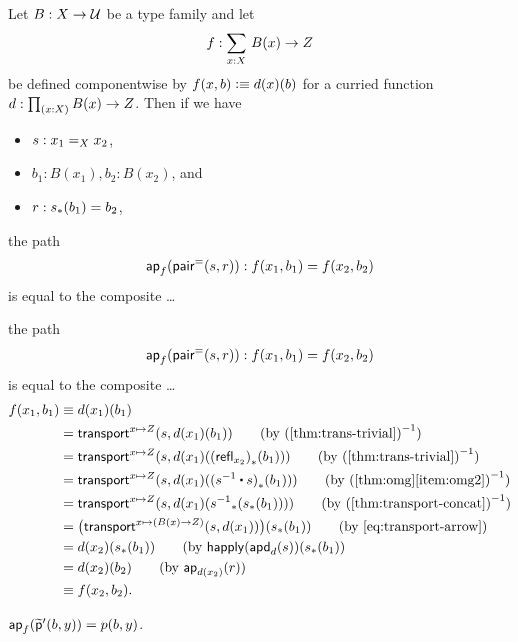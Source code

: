 \documentclass[centering]{report}
\newenvironment{slide}
    {\newpage
    \vspace*{\fill}
    }
    { 
     \vspace*{\fill}
    }
\newcommand{\breakslide}{\vspace*{\fill}\newpage\vspace*{\fill}}
\begin{document}
\begin{slide}
\begin{lem}\label{thm:ap-sigma-rect-path-pair}
  Let $B:X\to\type$ be a type family and let
  \begin{align*}f:\sm{x:X} B(x) \to Z\end{align*}
  be defined componentwise by $f(x,b) \defeq d(x)(b)$ for a curried function $d:\prd{x:X} B(x)\to Z$.
  Then if we have
  \begin{itemize}
  \item $s:\id[X]{x_1}{x_2}$,
  \item $b_1:B(x_1), b_2:B(x_2)$, and
  \item $r:\trans{s}{b_1}=b_2$,
  \end{itemize}

 the path
  \begin{align*}
    \apfunc f (\pairpath(s,r)) :f(x_1,b_1) = f(x_2,b_2)
  \end{align*}
  is equal to the composite \dots

\breakslide

{\color{gray}
\everymath{\color{gray}}
the path
  \begin{align*}
    \apfunc f (\pairpath(s,r)) :f(x_1,b_1) = f(x_2,b_2)
  \end{align*}
  is equal to the composite \dots
}
{\LARGE
  \begin{align}
    f(x_1,b_1)
    &\jdeq d(x_1)(b_1) \notag\\
    &= \transfib{x\mapsto Z}{s}{d(x_1)(b_1)}
    \tag{by $\opp{\text{(\cref{thm:trans-trivial})}}$}\\
    &= \transfib{x\mapsto Z}{s}{d(x_1)(\trans{(\refl{x_2})}{b_1})}
    \tag{by $\opp{\text{(\cref{thm:trans-trivial})}}$}\\
    &= \transfib{x\mapsto Z}{s}{d(x_1)(\trans{(\opp s\ct s)}{b_1})}
    \tag{by $\opp{\text{(\cref{thm:omg}\ref{item:omg2})}}$}\\
    &= \transfib{x\mapsto Z}{s}{d(x_1)(\trans{\opp s}{\trans{s}{b_1}})}
    \tag{by $\opp{\text{(\cref{thm:transport-concat})}}$}\\
    &= \big(\transfib{x\mapsto (B(x)\to Z)}{s}{d(x_1)}\big)(\trans{s}{b_1})
    \tag{by~\eqref{eq:transport-arrow}}\\
    &= d(x_2)(\trans{s}{b_1})
    \tag{by $\happly(\apdfunc{d}(s))(\trans{s}{b_1}$}\\
    &= d(x_2)(b_2)
    \tag{by $\apfunc{d(x_2)}(r)$}\\
    &\jdeq f(x_2,b_2).
    \notag
  \end{align}
  }
\end{lem}
\vspace*{5mm}
\begin{lem}\label{thm:flattening-rectnd-beta-ppt}
  $\apfunc{f}(\ppt'(b,y)) = p(b,y)$.
\end{lem}
\end{slide}
\end{document}

